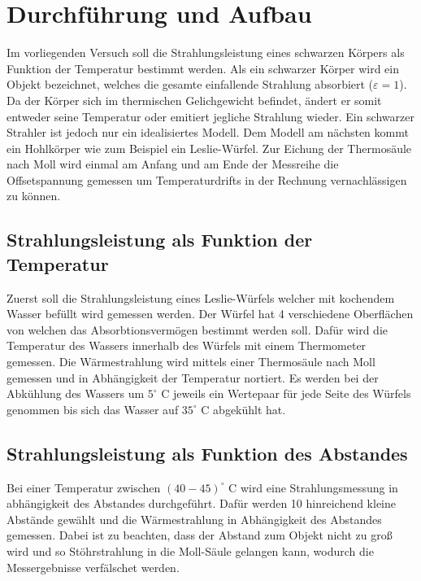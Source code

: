 \section{Durchführung und Aufbau}
\label{sec:Durchführung}
Im vorliegenden Versuch soll die Strahlungsleistung eines schwarzen Körpers als Funktion der Temperatur bestimmt werden. Als ein schwarzer Körper wird ein Objekt bezeichnet, welches die gesamte einfallende Strahlung absorbiert ($\varepsilon = 1$). Da der Körper sich im thermischen Gelichgewicht befindet, ändert er somit entweder seine Temperatur oder emitiert jegliche Strahlung wieder. Ein schwarzer Strahler ist jedoch nur ein idealisiertes Modell. Dem Modell am nächsten kommt ein Hohlkörper wie zum Beispiel ein Leslie-Würfel. Zur Eichung der Thermosäule nach Moll wird einmal am Anfang und am Ende der Messreihe die Offsetspannung gemessen um Temperaturdrifts in der Rechnung vernachlässigen zu können.
\subsection{Strahlungsleistung als Funktion der Temperatur}
Zuerst soll die Strahlungsleistung eines Leslie-Würfels welcher mit kochendem Wasser befüllt wird gemessen werden. Der Würfel hat 4 verschiedene Oberflächen von welchen das Absorbtionsvermögen bestimmt werden soll. Dafür wird die Temperatur des Wassers innerhalb des Würfels mit einem Thermometer gemessen. Die Wärmestrahlung wird mittels einer Thermosäule nach Moll gemessen und in Abhängigkeit der Temperatur nortiert. Es werden bei der Abkühlung des Wassers um $5^\circ$ C jeweils ein Wertepaar für jede Seite des Würfels genommen bis sich das Wasser auf $35^\circ$ C abgekühlt hat.
\subsection{Strahlungsleistung als Funktion des Abstandes}
Bei einer Temperatur zwischen $(40 - 45) ^\circ$ C wird eine Strahlungsmessung in abhängigkeit des Abstandes durchgeführt. Dafür werden 10 hinreichend kleine Abstände gewählt und die Wärmestrahlung in Abhängigkeit des Abstandes gemessen. Dabei ist zu beachten, dass der Abstand zum Objekt nicht zu groß wird und so Stöhrstrahlung in die Moll-Säule gelangen kann, wodurch die Messergebnisse verfälschet werden.
\newpage
